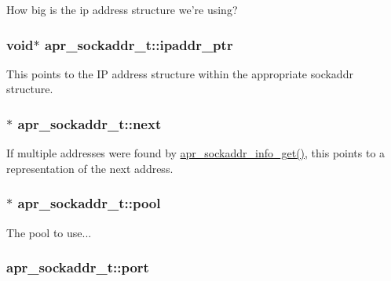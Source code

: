 How big is the ip address structure we're using? \hypertarget{structapr__sockaddr__t_a6e1b71121ada4047acde36c6777b5442}{
\subsubsection[{ipaddr\-\_\-ptr}]{\setlength{\rightskip}{0pt plus 5cm}void$\ast$ apr\-\_\-sockaddr\-\_\-t\-::ipaddr\-\_\-ptr}}\label{structapr__sockaddr__t_a6e1b71121ada4047acde36c6777b5442}
This points to the I\-P address structure within the appropriate sockaddr structure. \hypertarget{structapr__sockaddr__t_a774835c6b8e3adf255b752e8b126c434}{
\subsubsection[{next}]{$\ast$ apr\-\_\-sockaddr\-\_\-t\-::next}}\label{structapr__sockaddr__t_a774835c6b8e3adf255b752e8b126c434}
If multiple addresses were found by \hyperlink{group__apr__network__io_gaa2f399ca2b60b35c0abf7630298c6c9f}{apr\-\_\-sockaddr\-\_\-info\-\_\-get()}, this points to a representation of the next address. \hypertarget{structapr__sockaddr__t_a5f2d72a6a181cf2f54ba7c922aa0dfab}{
\subsubsection[{pool}]{$\ast$ apr\-\_\-sockaddr\-\_\-t\-::pool}}\label{structapr__sockaddr__t_a5f2d72a6a181cf2f54ba7c922aa0dfab}
The pool to use... \hypertarget{structapr__sockaddr__t_a174c19138de9c208f13ed71b5892e505}{
\subsubsection[{port}]{ apr\-\_\-sockaddr\-\_\-t\-::port}}\label{structapr__sockaddr__t_a174c19138de9c208f13ed71b5892e505}
